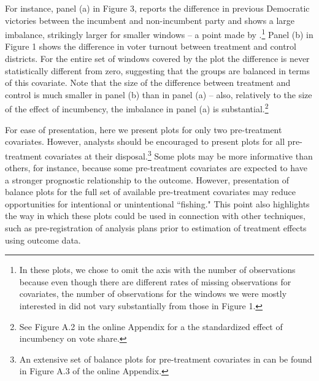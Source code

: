 \documentclass[letterpaper,twoside,12pt]{article}
\begin{document}
For instance, panel (a) in Figure 3, reports the difference in previous Democratic  victories between the incumbent and non-incumbent party and shows a large imbalance, strikingly larger for smaller windows -- a point made by \citet{caughey2011elections}.\footnote{In these plots, we chose to omit the axis with the number of observations because even though there are different rates of missing observations for covariates, the number of observations for the windows we were mostly interested in did not vary substantially from those in Figure 1.} Panel (b) in Figure 1 shows the difference in voter turnout between treatment and control districts. For the entire set of windows covered by the plot the difference is never statistically different from zero, suggesting that the groups are balanced in terms of this covariate. Note that the size of the difference between treatment and control is much smaller in panel (b) than in panel (a) -- also, relatively to the size of the effect of incumbency, the imbalance in panel (a) is substantial.\footnote{See Figure A.2 in the online Appendix for a the standardized effect of incumbency on vote share.}

For ease of presentation, here we present plots for only two pre-treatment covariates.  However, analysts should be encouraged to present plots for all pre-treatment covariates at their disposal.\footnote{An extensive set of balance plots for pre-treatment covariates in \citet{caughey2011elections} can be found in Figure A.3 of the online Appendix.} Some plots may be more informative than others, for instance, because some pre-treatment covariates are expected to have a stronger prognostic relationship to the outcome. However, presentation of balance plots for the full set of available pre-treatment covariates may reduce opportunities for intentional or unintentional ``fishing." This point also highlights the way in which these plots could be used in connection with other techniques, such as pre-registration of analysis plans prior to estimation of treatment effects using outcome data.
\end{document}
